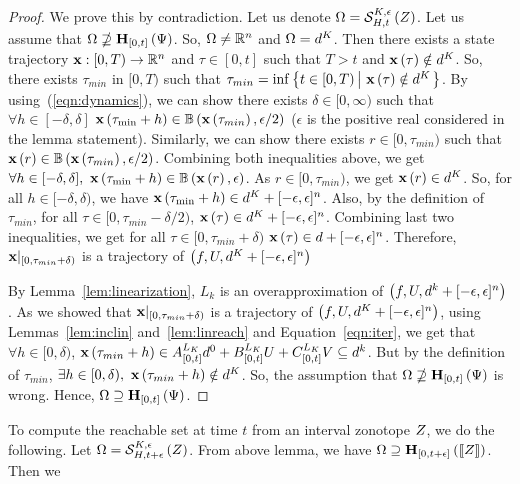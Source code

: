 \begin{proof}
We prove this by contradiction.  Let us denote $\Omega
= \mathcal{S}_{H,t}^{K,\epsilon}\left(Z\right)$.  Let us assume that
$\Omega\nsupseteq \mathbf{H}_{[0,t]}\left(\Psi\right)$.  So, $\Omega\neq\mathbb{R}^n$
and $\Omega = d^K$.  Then there exists a state trajectory
$\mathbf{x}:[0,T)\rightarrow\mathbb{R}^n$ and $\tau\in[0,t]$ such that $T>t$
and $\mathbf{x}\left(\tau\right)\notin d^K$.  So, there exists $\tau_{min}$ in
$[0,T)$ such that $\tau_{min}
= \inf\left\{t\in[0,T)\left|~\mathbf{x}\left(\tau\right)\notin d^K\right.\right\}$.  By
using~(\ref{eqn:dynamics}), we can show there exists
$\delta\in[0,\infty)$ such that $\forall h\in[-\delta,\delta]$
$\mathbf{x}\left(\tau_{\min}+h\right)\in \mathbb{B}\left(\mathbf{x}\left(\tau_{min}\right),\epsilon/2\right)$
($\epsilon$ is the positive real considered in the lemma statement).
Similarly, we can show there exists $r\in[0,\tau_{min})$ such that
$\mathbf{x}\left(r\right)\in \mathbb{B}\left(\mathbf{x}\left(\tau_{min}\right),\epsilon/2\right)$.  Combining both
inequalities above, we get $\forall
h\in[-\delta,\delta],~\mathbf{x}\left(\tau_{\min}+h\right)\in \mathbb{B}\left(\mathbf{x}\left(r\right),\epsilon\right)$.
As $r\in[0,\tau_{min})$, we get $\mathbf{x}\left(r\right)\in d^K$.  So, for all
$h\in[-\delta,\delta)$, we have $\mathbf{x}\left(\tau_{\min}+h\right)\in d^K +
[-\epsilon,\epsilon]^n$.  Also, by the definition of $\tau_{min}$, for
all $\tau\in[0,\tau_{min}-\delta/2)$, $\mathbf{x}\left(\tau\right)\in d^K +
[-\epsilon,\epsilon]^n$. Combining last two inequalities, we get for
all $\tau\in[0,\tau_{min}+\delta)$ $\mathbf{x}\left(\tau\right)\in d +
[-\epsilon,\epsilon]^n$.  Therefore,
$\mathbf{x}|_{[0,\tau_{min}+\delta)}$ is a trajectory of
$\left(f,U,d^K+[-\epsilon,\epsilon]^n\right)$

By Lemma~\ref{lem:linearization}, $L_k$ is an overapproximation of
$\left(f,U,d^k+[-\epsilon,\epsilon]^n\right)$ .  As we showed that
$\mathbf{x}|_{[0,\tau_{min}+\delta)}$ is a trajectory of
$\left(f,U,d^K+[-\epsilon,\epsilon]^n\right)$, using
Lemmas~\ref{lem:inclin} and~\ref{lem:linreach} and
Equation~\ref{eqn:iter}, we get that $\forall h\in [0,\delta)$,
$\mathbf{x}\left(\tau_{min}+h\right)\in {A}^{L_K}_{[0,t]}d^0
+ {B}^{L_K}_{[0,t]}U
+ {C}^{L_K}_{[0,t]}V \subseteq d^{k}$.  But by the
definition of $\tau_{min}$, $\exists h\in
[0,\delta),~\mathbf{x}\left(\tau_{min}+h\right)\notin d^K$.  So, the assumption
that $\Omega\nsupseteq \mathbf{H}_{[0,t]}\left(\Psi\right)$ is wrong.  Hence,
$\Omega\supseteq \mathbf{H}_{[0,t]}\left(\Psi\right)$.
\end{proof}
%
To compute the reachable set at time $t$ from an interval zonotope
$Z$, we do the following.  Let $\Omega
= \mathcal{S}_{H,t+\epsilon}^{K,\epsilon}\left(Z\right)$.  From above lemma, we
have $\Omega\supseteq\mathbf{H}_{[0,t+\epsilon]}\left(\left\llbracket{Z}\right\rrbracket\right)$.  Then we
